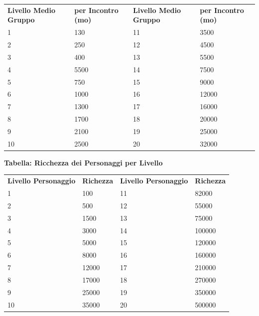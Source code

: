 \documentclass[a4paper,11pt,twoside,openany]{book}
\begin{document}
\begin{tabular}{llll}
	\toprule
	\textbf{Livello Medio Gruppo} & \textbf{per Incontro (mo)} & \textbf{Livello Medio Gruppo} & \textbf{per Incontro (mo)}\\
	1             & 130        & 11            & 3500\\
	2             & 250        & 12            & 4500\\
	3             & 400        & 13            & 5500\\
	4             & 5500       & 14            & 7500\\
	5             & 750        & 15            & 9000\\
	6             & 1000       & 16            & 12000\\
	7             & 1300       & 17            & 16000\\
	8             & 1700       & 18            & 20000\\
	9             & 2100       & 19            & 25000\\
	10            & 2500       & 20            & 32000\\
\end{tabular}
\bigskip

\textbf{Tabella: Ricchezza dei Personaggi per Livello}

\bigskip

\begin{tabular}{llll}
	\toprule
	\textbf{Livello Personaggio} & \textbf{Richezza} & \textbf{ Livello Personaggio} & \textbf{Richezza}\\
	1            & 100               & 11            & 82000\\
	2            & 500               & 12            & 55000\\
	3            & 1500              & 13            & 75000\\
	4            & 3000              & 14            & 100000\\
	5            & 5000              & 15            & 120000\\
	6            & 8000              & 16            & 160000\\
	7            & 12000             & 17            & 210000\\
	8            & 17000             & 18            & 270000\\
	9            & 25000             & 19            & 350000\\
	10           & 35000             & 20            & 500000\\
\end{tabular}
\end{document}
